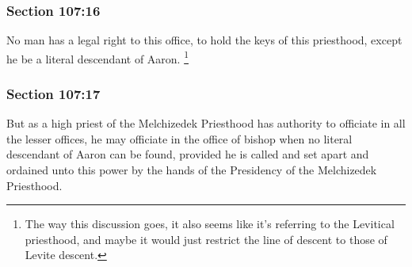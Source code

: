 
	\subsubsection{Section 107:16} %
		\label{DC107-16}

		No man has a legal right to this office, to hold the keys of this priesthood, except he be a literal descendant of Aaron.%
			\footnote{%
				The way this discussion goes, it also seems like it's referring to the Levitical priesthood, and maybe it would just restrict the line of descent to those of Levite descent.
				}


	\subsubsection{Section 107:17} %
		\label{DC107-17}

		But as a high priest of the Melchizedek Priesthood has authority to officiate in all the lesser offices, he may officiate in the office of bishop when no literal descendant of Aaron can be found, provided he is called and set apart and ordained unto this power by the hands of the Presidency of the Melchizedek Priesthood.



